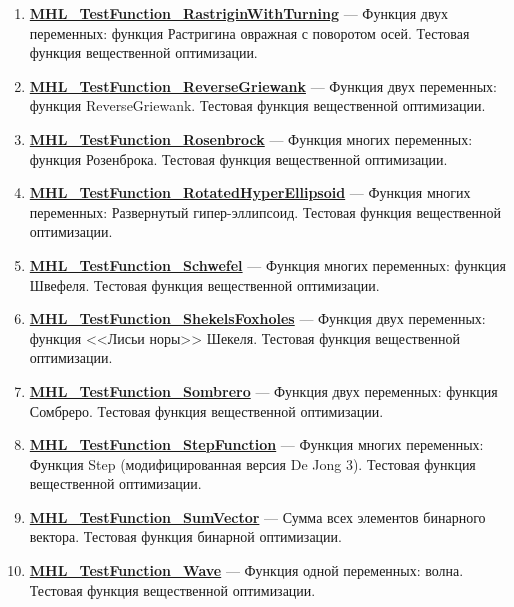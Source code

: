 \documentclass[a4paper,12pt]{article}
\begin{document}
\begin{enumerate}
\item \textbf{\hyperref[MHL_TestFunction_RastriginWithTurning]{MHL\_TestFunction\_RastriginWithTurning}} --- Функция двух переменных: функция Растригина овражная с поворотом осей. Тестовая функция вещественной оптимизации.

\item \textbf{\hyperref[MHL_TestFunction_ReverseGriewank]{MHL\_TestFunction\_ReverseGriewank}} --- Функция двух переменных: функция ReverseGriewank. Тестовая функция вещественной оптимизации.

\item \textbf{\hyperref[MHL_TestFunction_Rosenbrock]{MHL\_TestFunction\_Rosenbrock}} --- Функция многих переменных: функция Розенброка. Тестовая функция вещественной оптимизации.

\item \textbf{\hyperref[MHL_TestFunction_RotatedHyperEllipsoid]{MHL\_TestFunction\_RotatedHyperEllipsoid}} --- Функция многих переменных: Развернутый гипер-эллипсоид. Тестовая функция вещественной оптимизации.

\item \textbf{\hyperref[MHL_TestFunction_Schwefel]{MHL\_TestFunction\_Schwefel}} --- Функция многих переменных: функция Швефеля. Тестовая функция вещественной оптимизации.

\item \textbf{\hyperref[MHL_TestFunction_ShekelsFoxholes]{MHL\_TestFunction\_ShekelsFoxholes}} --- Функция двух переменных: функция <<Лисьи норы>> Шекеля. Тестовая функция вещественной оптимизации.

\item \textbf{\hyperref[MHL_TestFunction_Sombrero]{MHL\_TestFunction\_Sombrero}} --- Функция двух переменных: функция Сомбреро. Тестовая функция вещественной оптимизации.

\item \textbf{\hyperref[MHL_TestFunction_StepFunction]{MHL\_TestFunction\_StepFunction}} --- Функция многих переменных: Функция Step (модифицированная версия De Jong 3). Тестовая функция вещественной оптимизации.

\item \textbf{\hyperref[MHL_TestFunction_SumVector]{MHL\_TestFunction\_SumVector}} --- Сумма всех элементов бинарного вектора. Тестовая функция бинарной оптимизации.

\item \textbf{\hyperref[MHL_TestFunction_Wave]{MHL\_TestFunction\_Wave}} --- Функция одной переменных: волна. Тестовая функция вещественной оптимизации.

\end{enumerate}
\end{document}
